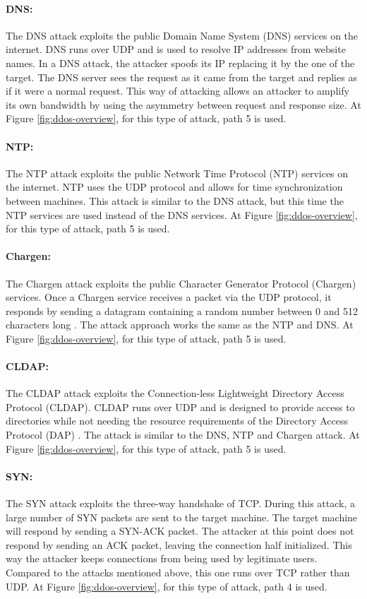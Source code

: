 \paragraph{DNS:}
The DNS attack exploits the public Domain Name System (DNS) services on the internet. DNS runs over UDP and is used to resolve IP addresses from website names. In a DNS attack, the attacker spoofs its IP replacing it by the one of the target. The DNS server sees the request as it came from the target and replies as if it were a normal request. This way of attacking allows an attacker to amplify its own bandwidth by using the asymmetry between request and response size. At Figure \ref{fig:ddos-overview}, for this type of attack, path 5 is used.

\paragraph{NTP:}
The NTP attack exploits the public Network Time Protocol (NTP) services on the internet. NTP uses the UDP protocol and allows for time synchronization between machines. This attack is similar to the DNS attack, but this time the NTP services are used instead of the DNS services. At Figure \ref{fig:ddos-overview}, for this type of attack, path 5 is used.

\paragraph{Chargen:}
The Chargen attack exploits the public Character Generator Protocol (Chargen) services. Once a Chargen service receives a packet via the UDP protocol, it responds by sending a datagram containing a random number between 0 and 512 characters long \cite{ietf1983}. The attack approach works the same as the NTP and DNS. At Figure \ref{fig:ddos-overview}, for this type of attack, path 5 is used.   

\paragraph{CLDAP:}
The CLDAP attack exploits the Connection-less Lightweight Directory Access Protocol (CLDAP). CLDAP runs over UDP and is designed to provide access to directories while not needing the resource requirements of the Directory Access Protocol (DAP) \cite{ietf1995}. The attack is similar to the DNS, NTP and Chargen attack. At Figure \ref{fig:ddos-overview}, for this type of attack, path 5 is used.

\paragraph{SYN:}
The SYN attack exploits the three-way handshake of TCP. During this attack, a large number of SYN packets are sent to the target machine. The target machine will respond by sending a SYN-ACK packet. The attacker at this point does not respond by sending an ACK packet, leaving the connection half initialized. This way the attacker keeps connections from being used by legitimate users. Compared to the attacks mentioned above, this one runs over TCP rather than UDP. At Figure \ref{fig:ddos-overview}, for this type of attack, path 4 is used.

